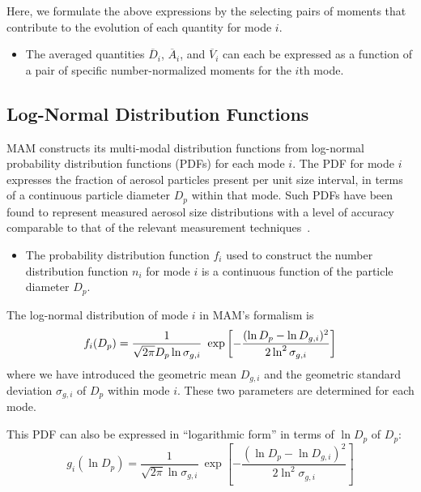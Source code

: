 Here, we formulate the above expressions by the selecting pairs of moments that
contribute to the evolution of each quantity for mode $i$.

\begin{itemize}
  \item \assume The averaged quantities $\overline{D}_i$, $\overline{A}_i$,
    and $\overline{V}_i$ can each be expressed as a function of a pair of
    specific number-normalized moments for the $i$th mode.
\end{itemize}

\subsection*{Log-Normal Distribution Functions}

MAM constructs its multi-modal distribution functions from log-normal
probability distribution functions (PDFs) for each mode $i$. The PDF for mode
$i$ expresses the fraction of aerosol particles present per unit size interval,
in terms of a continuous particle diameter $D_p$ within that mode. Such PDFs
have been found to represent measured aerosol size distributions with a level of
accuracy comparable to that of the relevant measurement
techniques~\cite{Whitby1991}.

\begin{itemize}
  \item \assume The probability distribution function $f_i$ used to construct
        the number distribution function $n_i$ for mode $i$ is a continuous
        function of the particle diameter $D_p$.
\end{itemize}

The log-normal distribution of mode $i$ in MAM's formalism is
\begin{equation}\labeleq{log_normal_pdf}
  f_i(D_p) = \frac{1}{\sqrt{2\pi} D_p \ln \sigma_{g,i}} \ 
      \exp \left [-\frac{(\ln D_p - \ln D_{g,i})^2}{2\ln^2 \sigma_{g,i}} \right]
\end{equation}
where we have introduced the geometric mean $D_{g,i}$ and the geometric standard
deviation $\sigma_{g,i}$ of $D_p$ within mode $i$. These two parameters are
determined for each mode.

This PDF can also be expressed in ``logarithmic form'' in terms of $\ln D_p$
of $D_p$:
\begin{equation}\label{eq:log_normal_pdf_log}
  g_i(\ln D_p) = \frac{1}{\sqrt{2\pi} \ln\sigma_{g,i}} \
      \exp \left [ -\frac{(\ln D_p - \ln D_{g,i})^2}{2\ln^2 \sigma_{g,i}} \right]
\end{equation}

